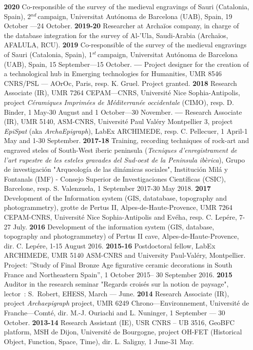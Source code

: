 \documentclass{article}
\begin{document}
\textbf{2020 }Co-responsible of the survey of the medieval engravings of Sauri (Catalonia, Spain), 2${}^{nd\ }$campaign, Universitat Aut\'{o}noma de Barcelona (UAB), Spain, 19 October ---24 October.
\smallbreak
\textbf{2019-20 }Researcher at Archa\"{i}os company, in charge of the database integration for the survey of Al-'Ula, Saudi-Arabia (Archa\"{i}os, AFALULA, RCU).
\smallbreak
\textbf{2019 }Co-responsible of the survey of the medieval engravings of Sauri (Catalonia, Spain), 1${}^{st\ }$campaign, Universitat Aut\'{o}noma de Barcelona (UAB), Spain, 15 September---15 October.
\smallbreak
\textbf{---  }Project designer for the creation of a technological hub in Emerging technologies for Humanities, UMR 8546 CNRS/PSL --- AOrOc, Paris, resp. K. Gruel. Project granted.
\smallbreak
\textbf{2018 }Research Associate (IR), UMR 7264 CEPAM---CNRS, Universit\'{e} Nice Sophia-Antipolis, project \textit{C\'{e}ramiques Imprim\'{e}es de M\'{e}diterran\'{e}e occidentale} (CIMO), resp. D. Binder, 1 May-30 August and 1 October---30 November.
\smallbreak
\textbf{---  }Research Associate (IR), UMR 5140, ASM-CNRS, Universit\'{e} Paul Val\'{e}ry Montpellier 3, project \textit{EpiSpat} (aka \textit{ArchaEpigraph}), LabEx ARCHIMEDE, resp. C. Pellecuer, 1 April-1 May and 1-30 September.
\smallbreak
\textbf{2017-18 }Training, recording techniques of rock-art and engraved steles of South-West iberic peninsula (\textit{Tecniques d'enregistrament de l'art rupestre de les esteles gravades del Sud-oest de la Peninsula ibèrica}), Grupo de investigaci\'{o}n "Arqueolog\'{i}a de las din\'{a}micas sociales", Instituci\'{o}n Mil\'{a} y Fontanals (IMF) - Consejo Superior de Investigaciones Cient\'{i}ficas (CSIC), Barcelone, resp. S. Valenzuela, 1 September 2017-30 May 2018.
\smallbreak
\textbf{2017 }Development of the Information system (GIS, datatabase, topography and photogrammetry), grotte de Pertus II, Alpes-de-Haute-Provence, UMR 7264 CEPAM-CNRS, Universit\'{e} Nice Sophia-Antipolis and Ev\'{e}ha, resp. C. Lep\'{e}re, 7-27 July.
\smallbreak
\textbf{2016 }Development of the information system (GIS, database, topography and photogrammetry) of Pertus II cave, Alpes-de-Haute-Provence, dir. C. Lep\'{e}re, 1-15 August 2016.
\smallbreak
\textbf{2015-16 }Postdoctoral fellow, LabEx ARCHIMEDE, UMR 5140 ASM-CNRS and University Paul-Val\'{e}ry, Montpellier. Project: ''Study of Final Bronze Age figurative ceramic decorations in South France and Northeastern Spain'', 1 October 2015-- 30 September 2016.
\smallbreak
\textbf{2015 }Auditor in the research seminar "Regards crois\'{e}s sur la notion de paysage", lector~: S.~Robert, EHESS, March --- June.\textbf{}
\smallbreak
\textbf{2014 }Research\textbf{ }Associate (IR), project \textit{Archaepigraph} project, UMR 6249 Chrono---Environnement, Universit\'{e} de Franche---Comt\'{e}, dir. M.-J. Ouriachi and L. Nuninger, 1 September --- 30 October.
\smallbreak
\textbf{2013-14  }Research Assistant (IE), USR CNRS -- UB 3516, GeoBFC platform, MSH de Dijon, Universit\'{e} de Bourgogne, project OH-FET (Historical Object, Function, Space, Time), dir. L. Saligny, 1 June-31 May.
\end{document}
